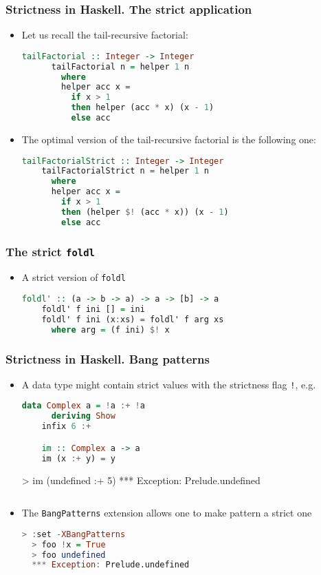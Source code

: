 \documentclass[10pt,pdf,utf8,russian,aspectratio=169]{beamer}
\begin{document}
\begin{frame}[fragile]
  \frametitle{Strictness in Haskell. The strict application}
  \begin{itemize}
    \item Let us recall the tail-recursive factorial:
    \begin{lstlisting}[language=Haskell]
      tailFactorial :: Integer -> Integer
      tailFactorial n = helper 1 n
        where
        helper acc x =
          if x > 1
          then helper (acc * x) (x - 1)
          else acc
    \end{lstlisting}
    \item The optimal version of the tail-recursive factorial is the following one:
    \begin{lstlisting}[language=Haskell] 
    tailFactorialStrict :: Integer -> Integer
    tailFactorialStrict n = helper 1 n
      where
      helper acc x =
        if x > 1
        then (helper $! (acc * x)) (x - 1)
        else acc
      \end{lstlisting}
  \end{itemize}
\end{frame}

\begin{frame}[fragile]
  \frametitle{The strict \verb"foldl"}

  \begin{itemize}
    \item A strict version of \verb"foldl"
    \begin{lstlisting}[language=Haskell]
    foldl' :: (a -> b -> a) -> a -> [b] -> a
    foldl' f ini [] = ini
    foldl' f ini (x:xs) = foldl' f arg xs
      where arg = (f ini) $! x
    \end{lstlisting}
  \end{itemize}
\end{frame}

\begin{frame}[fragile]
  \frametitle{Strictness in Haskell. Bang patterns}
  \begin{itemize}
    \item A data type might contain strict values with the strictness flag \verb"!", e.g.
    \begin{lstlisting}[language=Haskell]
    data Complex a = !a :+ !a
      deriving Show
    infix 6 :+

    im :: Complex a -> a
    im (x :+ y) = y
    \end{lstlisting}
    > im (undefined :+ 5)
    *** Exception: Prelude.undefined
    \begin{lstlisting}[language=Haskell]
    \end{lstlisting}

  \item The \verb"BangPatterns" extension allows one to make pattern a strict one
  \begin{lstlisting}[language=Haskell]
  > :set -XBangPatterns
  > foo !x = True
  > foo undefined
  *** Exception: Prelude.undefined
  \end{lstlisting}
  \end{itemize}
\end{frame}
\end{document}
